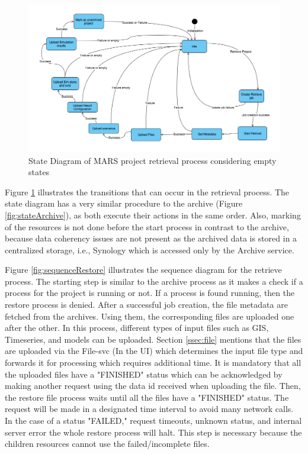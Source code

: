     \begin{figure}[H]
        \centering \includegraphics[scale=0.45]{grafiken/stateRestore.png}
        \caption{State Diagram of MARS project retrieval process considering empty states}
        \label{fig:stateRestore}
    \end{figure}

    Figure \ref{fig:stateRestore} illustrates the transitions that can occur in the retrieval process. The state diagram has a very similar procedure to the
    archive (Figure \ref{fig:stateArchive}), as both execute their actions in the same order. 
    Also, marking of the resources is not done before the start process in contrast to the archive, because data coherency issues are not present as the archived
    data is stored in a centralized storage, i.e., Synology which is accessed only by the Archive service.   

Figure \ref{fig:sequenceRestore} illustrates the sequence diagram for the retrieve process. The starting step is similar to the archive process 
as it makes a check if a process for the project is running or not. If a process is found running, then the restore process is denied. After a
successful job creation, the file metadata are fetched from the archives. Using them, the corresponding files are uploaded one after the other. 
In this process, different types of input files such as GIS, Timeseries, and models can be uploaded. Section \ref{ssec:file} mentions that the files are uploaded via
the File-svc (In the UI) which determines the input file type and forwards it for processing which requires additional time.
It is mandatory
that all the uploaded files have a "FINISHED" status which can be acknowledged by making another request using the data id received when uploading the file. 
Then, the restore file process waits until all the files have a "FINISHED" status. The request will be made in a designated time interval to avoid many
network calls. In the case of a status "FAILED," request timeouts, unknown status, and internal server error the whole restore process will halt. 
This step is necessary because the children resources cannot use the failed/incomplete files.

